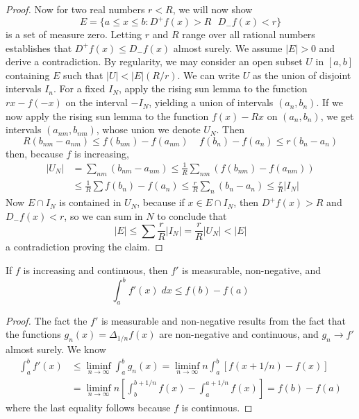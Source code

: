 \begin{proof}
    Now for two real numbers $r < R$, we will now show
    \[ E = \{ a \leq x \leq b : D^+ f(x) > R\ \ \ D_-f(x) < r \} \] 
    is a set of measure zero. Letting $r$ and $R$ range over all rational numbers establishes that $D^+ f(x) \leq D_-f(x)$ almost surely. We assume $|E| > 0$ and derive a contradiction. By regularity, we may consider an open subset $U$ in $[a,b]$ containing $E$ such that $|U| < |E| (R/r)$. We can write $U$ as the union of disjoint intervals $I_n$. For a fixed $I_N$, apply the rising sun lemma to the function $rx - f(-x)$ on the interval $-I_N$, yielding a union of intervals $(a_n,b_n)$. If we now apply the rising sun lemma to the function $f(x) - Rx$ on $(a_n, b_n)$, we get intervals $(a_{nm}, b_{nm})$, whose union we denote $U_N$. Then
    \[ R(b_{nm} - a_{nm}) \leq f(b_{nm}) - f(a_{nm})\ \ \ \ \ f(b_n) - f(a_n) \leq r(b_n - a_n) \]
    then, because $f$ is increasing,
    \begin{align*}
      |U_N| &= \sum_{nm} (b_{nm} - a_{nm}) \leq \frac{1}{R} \sum_{nm} (f(b_{nm}) - f(a_{nm}))\\
      &\leq \frac{1}{R} \sum f(b_n) - f(a_n) \leq \frac{r}{R} \sum_n (b_n - a_n) \leq \frac{r}{R} |I_N|
    \end{align*}
    Now $E \cap I_N$ is contained in $U_N$, because if $x \in E \cap I_N$, then $D^+ f(x) > R$ and $D_- f(x) < r$, so we can sum in $N$ to conclude that
    \[ |E| \leq \sum \frac{r}{R} |I_N| = \frac{r}{R} |U_N| < |E| \]
    a contradiction proving the claim.
\end{proof}

\begin{corollary}
  If $f$ is increasing and continuous, then $f'$ is measurable, non-negative, and
  \[ \int_a^b f'(x)\; dx \leq f(b) - f(a) \]
\end{corollary}
\begin{proof}
  The fact the $f'$ is measurable and non-negative results from the fact that the functions $g_n(x) = \Delta_{1/n} f(x)$ are non-negative and continuous, and $g_n \to f'$ almost surely. We know
  \begin{align*}
    \int_a^b f'(x) &\leq \liminf_{n \to \infty} \int_a^b g_n(x) = \liminf_{n \to \infty} n \int_a^b [f(x + 1/n) - f(x)]\\
    &= \liminf_{n \to \infty} n \left[ \int_b^{b+1/n} f(x) - \int_a^{a + 1/n} f(x) \right] = f(b) - f(a)
  \end{align*}
  where the last equality follows because $f$ is continuous.
\end{proof}

